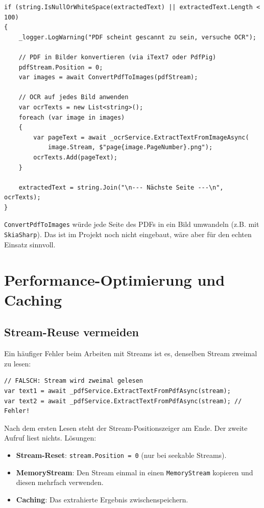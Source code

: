 \begin{lstlisting}[language={[Sharp]C}, caption={OCR-Fallback für gescannte PDFs (Konzept)}, label={lst:ocr_fallback}]
if (string.IsNullOrWhiteSpace(extractedText) || extractedText.Length < 100)
{
    _logger.LogWarning("PDF scheint gescannt zu sein, versuche OCR");
    
    // PDF in Bilder konvertieren (via iText7 oder PdfPig)
    pdfStream.Position = 0;
    var images = await ConvertPdfToImages(pdfStream);
    
    // OCR auf jedes Bild anwenden
    var ocrTexts = new List<string>();
    foreach (var image in images)
    {
        var pageText = await _ocrService.ExtractTextFromImageAsync(
            image.Stream, $"page{image.PageNumber}.png");
        ocrTexts.Add(pageText);
    }
    
    extractedText = string.Join("\n--- Nächste Seite ---\n", ocrTexts);
}
\end{lstlisting}

\texttt{ConvertPdfToImages} würde jede Seite des PDFs in ein Bild umwandeln (z.B. mit \texttt{SkiaSharp}). Das ist im Projekt noch nicht eingebaut, wäre aber für den echten Einsatz sinnvoll.

\section{Performance-Optimierung und Caching}
\label{sec:performance_optimization}

\subsection{Stream-Reuse vermeiden}
Ein häufiger Fehler beim Arbeiten mit Streams ist es, denselben Stream zweimal zu lesen:

\begin{lstlisting}[language={[Sharp]C}, caption={Stream-Reuse-Problem}, label={lst:stream_reuse}]
// FALSCH: Stream wird zweimal gelesen
var text1 = await _pdfService.ExtractTextFromPdfAsync(stream);
var text2 = await _pdfService.ExtractTextFromPdfAsync(stream); // Fehler!
\end{lstlisting}

Nach dem ersten Lesen steht der Stream-Positionszeiger am Ende. Der zweite Aufruf liest nichts. Lösungen:
\begin{itemize}
    \item \textbf{Stream-Reset}: \texttt{stream.Position = 0} (nur bei seekable Streams).
    \item \textbf{MemoryStream}: Den Stream einmal in einen \texttt{MemoryStream} kopieren und diesen mehrfach verwenden.
    \item \textbf{Caching}: Das extrahierte Ergebnis zwischenspeichern.
\end{itemize}

